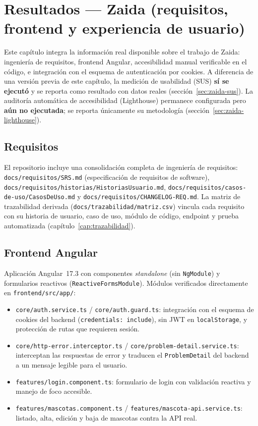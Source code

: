 \chapter{Resultados --- Zaida (requisitos, frontend y experiencia de usuario)}
\label{cap:resultados-zaida}

Este cap\'itulo integra la informaci\'on real disponible sobre el trabajo de
Zaida: ingenier\'ia de requisitos, frontend Angular, accesibilidad manual
verificable en el c\'odigo, e integraci\'on con el esquema de autenticaci\'on
por cookies. A diferencia de una versi\'on previa de este cap\'itulo, la
medici\'on de usabilidad (SUS) \textbf{s\'i se ejecut\'o} y se reporta como
resultado con datos reales (secci\'on~\ref{sec:zaida-sus}). La auditor\'ia
autom\'atica de accesibilidad (Lighthouse) permanece configurada pero
\textbf{a\'un no ejecutada}; se reporta \'unicamente su metodolog\'ia
(secci\'on~\ref{sec:zaida-lighthouse}).

\section{Requisitos}

El repositorio incluye una consolidaci\'on completa de ingenier\'ia de
requisitos: \texttt{docs/requisitos/SRS.md} (especificaci\'on de
requisitos de software), \texttt{docs/requisitos/historias/HistoriasUsuario.md},
\texttt{docs/requisitos/casos-de-uso/CasosDeUso.md} y
\texttt{docs/requisitos/CHANGELOG-REQ.md}. La matriz de trazabilidad
derivada (\texttt{docs/trazabilidad/matriz.csv}) vincula cada requisito con
su historia de usuario, caso de uso, m\'odulo de c\'odigo, endpoint y
prueba automatizada (cap\'itulo~\ref{cap:trazabilidad}).

\section{Frontend Angular}

Aplicaci\'on Angular~17.3 con componentes \emph{standalone} (sin
\texttt{NgModule}) y formularios reactivos (\texttt{ReactiveFormsModule}).
M\'odulos verificados directamente en \texttt{frontend/src/app/}:

\begin{itemize}[nosep]
  \item \texttt{core/auth.service.ts} / \texttt{core/auth.guard.ts}:
    integraci\'on con el esquema de cookies del backend
    (\texttt{credentials: include}), sin JWT en \texttt{localStorage}, y
    protecci\'on de rutas que requieren sesi\'on.
  \item \texttt{core/http-error.interceptor.ts} /
    \texttt{core/problem-detail.service.ts}: interceptan las respuestas de
    error y traducen el \texttt{ProblemDetail} del backend a un mensaje
    legible para el usuario.
  \item \texttt{features/login.component.ts}: formulario de login con
    validaci\'on reactiva y manejo de foco accesible.
  \item \texttt{features/mascotas.component.ts} /
    \texttt{features/mascota-api.service.ts}: listado, alta, edici\'on y
    baja de mascotas contra la API real.
\end{itemize}

